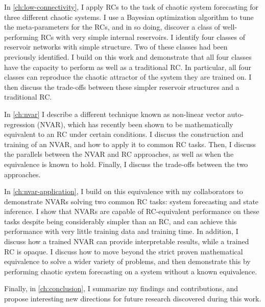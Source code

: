 In \cref{ch:low-connectivity}, I apply RCs to the task of chaotic
system forecasting for three different chaotic systems. I use a
Bayesian optimization algorithm to tune the meta-parameters for the
RCs, and in so doing, discover a class of well-performing RCs with very
simple internal reservoirs. I identify four classes of reservoir
networks with simple structure. Two of these classes had been
previously identified. I build on this work and demonstrate that all
four classes have the capacity to perform as well as a traditional
RC. In particular, all four classes can reproduce the chaotic
attractor of the system they are trained on. I then discuss the
trade-offs between these simpler reservoir structures and a
traditional RC.

In \cref{ch:nvar} I describe a different technique known as
non-linear vector auto-regression (NVAR), which has recently been shown
to be mathematically equivalent to an RC under certain conditions. I
discuss the construction and training of an NVAR, and how to apply it
to common RC tasks. Then, I discuss the parallels between the NVAR
and RC approaches, as well as when the equivalence is known to
hold. Finally, I discuss the trade-offs between the two approaches.

In \cref{ch:nvar-application}, I build on this equivalence with my
collaborators to demonstrate NVARs solving two common RC tasks: system
forecasting and state inference. I show that NVARs are capable of
RC-equivalent performance on these tasks despite being considerably
simpler than an RC, and can achieve this performance with very little
training data and training time. In addition, I discuss how a trained
NVAR can provide interpretable results, while a trained RC is
opaque. I discuss how to move beyond the strict proven mathematical
equivalence to solve a wider variety of problems, and then demonstrate
this by performing chaotic system forecasting on a system without a
known equivalence.


Finally, in \cref{ch:conclusion}, I summarize my findings and
contributions, and propose interesting new directions for future
research discovered during this work.
